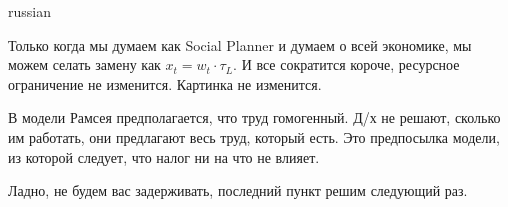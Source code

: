 \documentclass{article}
\begin{document}
\begin{otherlanguage*}{russian}
\begin{enumerate}
Только когда мы думаем как Social Planner и думаем о всей экономике, мы можем селать замену как $ x_t = w_t \cdot \tau_L$. И все сократится короче, ресурсное ограничение не изменится. Картинка не изменится. 

В модели Рамсея предполагается, что труд гомогенный. Д/х не решают, сколько им работать, они предлагают весь труд, который есть. Это предпосылка модели, из которой следует, что налог ни на что не влияет. 

Ладно, не будем вас задерживать, последний пункт решим следующий раз.
\end{enumerate}
\end{otherlanguage*} 
\end{document}
